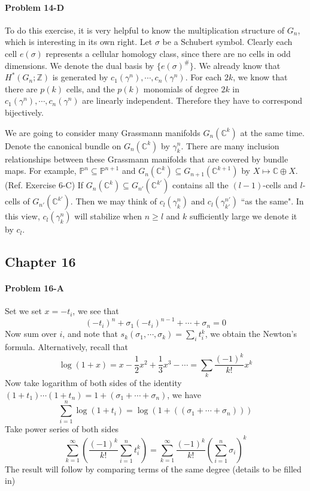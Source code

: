 \documentclass[12pt]{article}
\theoremstyle{plain}
\theoremstyle{definition}
\newcommand{\IC}{\mathbb{C}}
\newcommand{\IP}{\mathbb{P}}
\newcommand{\IZ}{\mathbb{Z}}
\newcommand{\<}{\langle}
\renewcommand{\>}{\rangle}
\begin{document}
\paragraph{Problem 14-D}
To do this exercise, it is very helpful to know the multiplication structure of $G_n$, which is interesting in its own right. Let $\sigma$ be a Schubert symbol. Clearly each cell $e(\sigma)$ represents a cellular homology class, since there are no cells in odd dimensions. We denote the dual basis by $\{ e(\sigma)^\# \}$. We already know that $H^*(G_n; \IZ)$ is generated by $c_1(\gamma^n), \cdots, c_n(\gamma^n)$. For each $2k$, we know that there are $p(k)$ cells, and the $p(k)$ monomials of degree $2k$ in $c_1(\gamma^n), \cdots, c_n(\gamma^n)$ are linearly independent. Therefore they have to correspond bijectively. 

We are going to consider many Grassmann manifolds $G_n(\IC^k)$ at the same time. Denote the canonical bundle on $G_n(\IC^k)$ by $\gamma_k^n$. There are many inclusion relationships between these Grassmann manifolds that are covered by bundle maps. For example, $\IP^n \subseteq \IP^{n + 1}$ and $G_n(\IC^k) \subseteq G_{n + 1}(\IC^{k + 1})$ by $X \mapsto \IC \oplus X$. (Ref. Exercise 6-C) If $G_n(\IC^k) \subseteq G_{n'}(\IC^{k'})$ contains all the $(l-1)$-cells and $l$-cells of $G_{n'}(\IC^{k'})$. Then we may think of $c_l(\gamma^n_k)$ and $c_l(\gamma^{n'}_{k'})$ ``as the same". In this view, $c_l(\gamma^n_k)$ will stabilize when $n \ge l$ and $k$ sufficiently large we denote it by $c_l$. 

\subsection*{Chapter 16}

\paragraph{Problem 16-A}
Set we set $x = - t_i$, we see that 
$$ (-t_i)^n + \sigma_1 (-t_i)^{n - 1} + \cdots + \sigma_n = 0 $$
Now sum over $i$, and note that $s_k(\sigma_1, \cdots, \sigma_k) = \sum_i t_i^k$, we obtain the Newton's formula. Alternatively, recall that 
$$ \log(1 + x) = x - \frac{1}{2} x^2 + \frac{1}{3} x^3 - \cdots = \sum_{k} \frac{(-1)^k}{k!} x^k $$
Now take logarithm of both sides of the identity $(1 + t_1) \cdots (1 + t_n) = 1 + (\sigma_1 + \cdots + \sigma_n)$, we have 
$$ \sum_{i = 1}^n \log(1 + t_i) = \log(1 + ((\sigma_1 + \cdots + \sigma_n)))$$
Take power series of both sides
$$\sum_{k = 1}^\infty (\frac{(-1)^k}{k!} \sum_{i = 1}^n t_i^k) = \sum_{k = 1}^\infty \frac{(-1)^k}{k!} (\sum_{i = 1}^n \sigma_i)^k $$
The result will follow by comparing terms of the same degree (details to be filled in)
\end{document}
